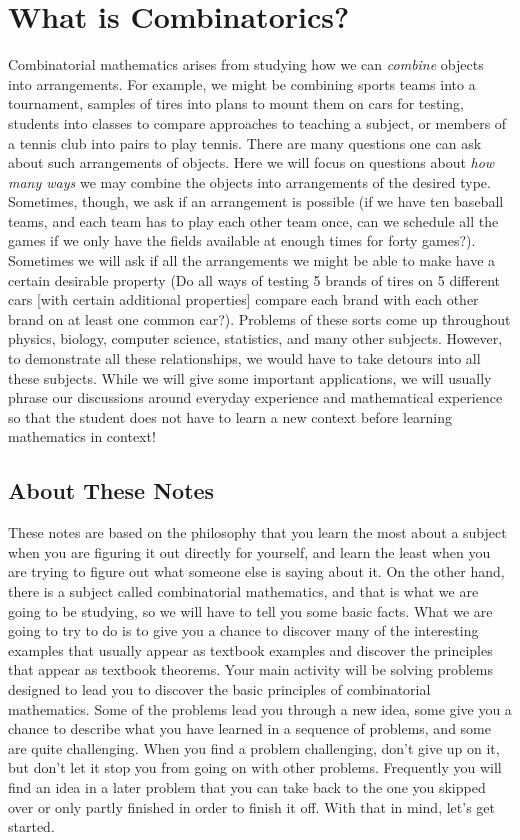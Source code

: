 \chapter{What is Combinatorics?} Combinatorial mathematics
arises from studying how we can {\em combine} objects into
arrangements. For example, we might be combining sports teams
into a tournament, samples of tires into plans to mount them
on cars for testing,  students into classes to compare
approaches to teaching a subject, or members of a tennis club into pairs to
play tennis.  There are many questions one can ask about such arrangements of
objects.  Here we will focus on questions about {\em how many ways} we may
combine the objects into arrangements of the desired type.  Sometimes,
though, we ask if an arrangement is possible (if we have ten baseball teams,
and each team has to play each other team once, can we schedule all the games
if we only have the fields available at enough times for forty games?). 
Sometimes we will ask if all the arrangements we might be able to make have a
certain desirable property (Do all ways of testing 5 brands of tires on 5
different cars [with certain additional properties] compare each brand with
each other brand on at least one common car?).    Problems of these sorts
come up throughout physics, biology, computer science, statistics, and many
other subjects.  However, to demonstrate all these relationships, we would
have to take detours into all these subjects.  While we will give some
important applications, we will usually phrase our discussions around everyday
experience and mathematical experience so that the student does not have to
learn a new context before learning mathematics in context!


\section{About These Notes}  These notes are based on the
philosophy that you learn the most about a subject when you
are figuring it out  directly for yourself, and learn the
least when you are trying to figure out what someone else is
saying about it.  On the other hand, there is a subject called
combinatorial mathematics, and that is what we are going to be
studying, so we will have to tell you some basic facts.  What
we are going to try to do is to give you a chance to discover
many of the interesting examples that usually appear as
textbook examples and discover the principles that appear as
textbook theorems.  Your main activity will be solving problems designed
to lead you to discover the basic principles of combinatorial
mathematics.  Some of the problems lead you through a new idea, some give
you a chance to describe what you have learned in a sequence of problems,
and some are quite challenging.  When you find a problem challenging,
don't give up on it, but don't let it stop you from going on with other
problems.  Frequently you will find an idea in a later problem that you
can take back to the one you skipped over or only partly finished in order
to finish it off.  With that in mind, let's get started.  


